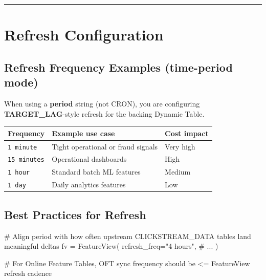 \documentclass[
  letterpaper,
  DIV=11,
  numbers=noendperiod]{scrreprt}
\newenvironment{Shaded}{\begin{snugshade}}{\end{snugshade}}
\newcommand{\CommentTok}[1]{\textcolor[rgb]{0.37,0.37,0.37}{#1}}
\newcommand{\NormalTok}[1]{\textcolor[rgb]{0.00,0.23,0.31}{#1}}
\newcommand{\OperatorTok}[1]{\textcolor[rgb]{0.37,0.37,0.37}{#1}}
\newcommand{\StringTok}[1]{\textcolor[rgb]{0.13,0.47,0.30}{#1}}
\begin{document}
\begin{center}\rule{0.5\linewidth}{0.5pt}\end{center}

\hypertarget{sec-refresh}{%
\section{Refresh Configuration}\label{sec-refresh}}

\hypertarget{refresh-frequency-examples-time-period-mode}{%
\subsection{Refresh Frequency Examples (time-period
mode)}\label{refresh-frequency-examples-time-period-mode}}

When using a \textbf{period} string (not CRON), you are configuring
\textbf{TARGET\_LAG}-style refresh for the backing Dynamic Table.

\begin{longtable}[]{@{}lll@{}}
\toprule\noalign{}
Frequency & Example use case & Cost impact \\
\midrule\noalign{}
\endhead
\bottomrule\noalign{}
\endlastfoot
\texttt{1\ minute} & Tight operational or fraud signals & Very high \\
\texttt{15\ minutes} & Operational dashboards & High \\
\texttt{1\ hour} & Standard batch ML features & Medium \\
\texttt{1\ day} & Daily analytics features & Low \\
\end{longtable}

\hypertarget{best-practices-for-refresh}{%
\subsection{Best Practices for
Refresh}\label{best-practices-for-refresh}}

\begin{Shaded}
\begin{Highlighting}[]
\CommentTok{\# Align period with how often upstream CLICKSTREAM\_DATA tables land meaningful deltas}
\NormalTok{fv }\OperatorTok{=}\NormalTok{ FeatureView(}
\NormalTok{    refresh\_freq}\OperatorTok{=}\StringTok{"4 hours"}\NormalTok{,}
    \CommentTok{\# ...}
\NormalTok{)}

\CommentTok{\# For Online Feature Tables, OFT sync frequency should be \textless{}= FeatureView refresh cadence}
\end{Highlighting}
\end{Shaded}
\end{document}
